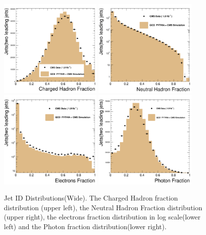 \begin{figure}[!ht]
  \begin{center}
    \includegraphics[width=0.45\textwidth]{Figures/c_fCh_fat.pdf}
    \includegraphics[width=0.45\textwidth]{Figures/c_fNh_fat.pdf}
    \includegraphics[width=0.45\textwidth]{Figures/c_fEl_fat.pdf}
    \includegraphics[width=0.45\textwidth]{Figures/c_fPh_fat.pdf}

    \caption{Jet ID Distributions(Wide).  The Charged Hadron fraction distribution
      (upper left), the Neutral Hadron Fraction distribution (upper right),
      the electrons fraction distribution in log scale(lower left) and the Photon
      fraction distribution(lower right). }
    \label{jet_id_wide}
  \end{center}
\end{figure}

